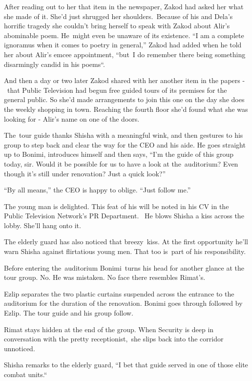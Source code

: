 \documentclass[twoside,11pt]{book}
\begin{document}
After reading out to her that item in the newspaper, Zakod had asked her what she made of it. She'd just shrugged her
shoulders.\ Because of his and Dela's horrific tragedy she couldn't bring herself to speak with Zakod about Alir's
abominable poem. He\ might even be unaware of its existence. ``I am a complete ignoramus when it comes to
poetry in general,'' Zakod had added when he told her about Alir's emcee appointment, ``but~I
do remember there being something disarmingly candid in his poems``. \ 

And then a day or two later Zakod shared with her another item in the papers -\ that Public Television had begun free
guided tours of its premises for the general public. So she'd made arrangements to join this one on the day she does
the weekly shopping in town. Reaching the fourth floor she'd found what she was looking for - Alir's name on one of the
doors.\ 

The~tour guide thanks Shisha with a meaningful wink, and then gestures to his group to step back and clear the way for
the CEO and his aide. He goes straight up to Bonimi, introduces himself and then says, ``I'm the guide of
this group today, sir. Would it be possible for us to have a look at the~auditorium? Even though it's still under
renovation? Just a quick look?'' 

``By all means,'' the CEO is happy to oblige. ``Just follow me.''

The young man is delighted. This feat of his will be noted in his CV in the Public Television Network's PR Department.
~He blows Shisha a kiss across the lobby. She'll hang onto it.

The elderly guard has also noticed that breezy\ kiss. \MakeUppercase{A}t the first opportunity he'll warn Shisha against
flirtatious young men. That too is~part of his responsibility.\ 

Before entering the\ auditorium Bonimi\ turns his head for another glance at the tour group. No. He was mistaken. No
face there resembles Rimat's. 

Ezlip separates the two plastic curtains suspended across the entrance to the auditorium for the duration of the
renovation. Bonimi goes through followed by Ezlip. The tour guide and his group follow. 

Rimat stays hidden at the end of the group. When Security is deep in conversation with the pretty receptionist,\ she
slips back into the corridor unnoticed.

Shisha remarks to the elderly guard, ``I bet that guide served in one of those elite combat
units.``\ \ 
\end{document}
